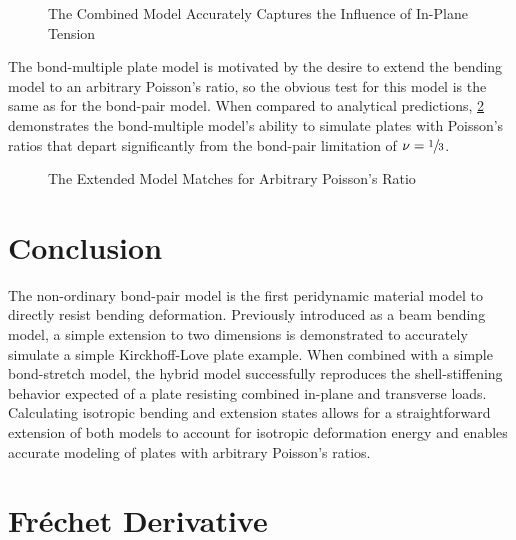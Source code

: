 \documentclass[preprint,review,12pt]{elsarticle}
\newcommand{\plotpath}{./plots}
\begin{document}
\begin{figure}[h]
  \centering
  \resizebox{0.55\linewidth}{!}{}
  \caption{The Combined Model Accurately Captures the Influence of In-Plane Tension}
  \label{fig:plateStiffening}
\end{figure}

The bond-multiple plate model is motivated by the desire to extend the bending model to an arbitrary Poisson's ratio, so the obvious test for this model is the same as for the bond-pair model. When compared to analytical predictions, \cref{fig:plate_poisson} demonstrates the bond-multiple model's ability to simulate plates with Poisson's ratios that depart significantly from the bond-pair limitation of $\nu = \sfrac{1}{3}$.

\begin{figure}[h]
  \centering
  \resizebox{0.55\linewidth}{!}{}
  \caption{The Extended Model Matches for Arbitrary Poisson's Ratio}
  \label{fig:plate_poisson}
\end{figure}


\section{Conclusion}

The non-ordinary bond-pair model is the first peridynamic material model to directly resist bending deformation.
Previously introduced as a beam bending model, a simple extension to two dimensions is demonstrated to accurately simulate a simple Kirckhoff-Love plate example.
When combined with a simple bond-stretch model, the hybrid model successfully reproduces the shell-stiffening behavior expected of a plate resisting combined in-plane and transverse loads.
Calculating isotropic bending and extension states allows for a straightforward extension of both models to account for isotropic deformation energy and enables accurate modeling of plates with arbitrary Poisson's ratios.


\appendix
\section{Fr\'echet Derivative}
\label{sec:frechet}
\end{document}
